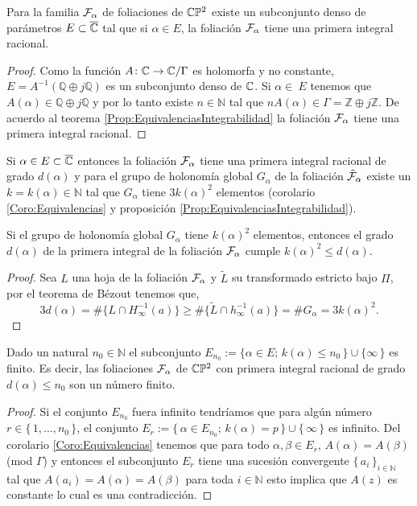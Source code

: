 \begin{Teorema}
\label{Teo:DensidadPrimerasIntegrales}
Para la familia $\mathcal{F}_{\alpha}$ de foliaciones de $\mathbb{C}\mathbb{P}^2$ existe un subconjunto denso de parámetros $E\subset\overline{\mathbb{C}}$ tal que si $\alpha\in E$, la foliación $\mathcal{F}_{\alpha}$ tiene una primera integral racional.
\end{Teorema}
\begin{proof}
Como la función $A\colon\mathbb{C}\rightarrow\mathbb{C}/\Gamma$ es holomorfa y no constante, $E=A^{-1}(\mathbb{Q}\oplus j\mathbb{Q})$ es un subconjunto denso de $\mathbb{C}$. Si $\alpha\in\ E$ tenemos que $A(\alpha)\in\mathbb{Q}\oplus j\mathbb{Q}$ y por lo tanto existe $n\in\mathbb{N}$ tal que $nA(\alpha)\in\Gamma=\mathbb{Z}\oplus j\mathbb{Z}$. De acuerdo al teorema \ref{Prop:EquivalenciasIntegrabilidad} la foliación $\mathcal{F}_{\alpha}$ tiene una primera integral racional.
\end{proof}

Si $\alpha\in E\subset\overline{\mathbb{C}}$ entonces la foliación $\mathcal{F}_{\alpha}$ tiene una primera integral racional de grado $d(\alpha)$ y para el grupo de holonomía global $G_{\alpha}$ de la foliación $\tilde{\mathcal{F}}_{\alpha}$ existe un $k=k(\alpha)\in\mathbb{N}$ tal que  $G_{\alpha}$ tiene $3k(\alpha)^{2}$ elementos (corolario \ref{Coro:Equivalencias} y proposición \ref{Prop:EquivalenciasIntegrabilidad}).

\begin{Lema}
\label{Lema:Cota}
Si el grupo de holonomía global $G_{\alpha}$ tiene $k(\alpha)^{2}$ elementos, entonces el grado $d(\alpha)$ de la primera integral de la foliación $\mathcal{F}_{\alpha}$ cumple $k(\alpha)^{2}\leq d(\alpha)$.
\end{Lema} 
\begin{proof}
Sea $L$ una hoja de la foliación $\mathcal{F}_{\alpha}$ y $\tilde{L}$ su transformado estricto bajo $\Pi$, por el teorema de Bézout tenemos que,
$$3d(\alpha)=\#\{L\cap H_{\infty}^{-1}(a)\}\geq\#\{\tilde{L}\cap h_{\infty}^{-1}(a)\}=\#G_{\alpha}=3k(\alpha)^{2}.$$
\end{proof}

\begin{Teorema}
\label{Teo:GradosGrandes}
Dado un natural $n_{0}\in\mathbb{N}$ el subconjunto $E_{n_{0}}:=\{\alpha\in E;\, k(\alpha)\leq n_{0}\, \}\cup\{\infty \, \}$ es finito. Es decir, las foliaciones $\mathcal{F}_{\alpha}$ de $\mathbb{C}\mathbb{P}^2$ con primera integral racional de grado $d(\alpha)\leq n_{0}$ son un número finito. 
\end{Teorema}
\begin{proof}
Si el conjunto $E_{n_{0}}$ fuera infinito tendríamos que para algún número $r\in\{\, 1,\ldots,n_{0} \, \}$, el conjunto $E_{r}:=\{\, \alpha\in E_{n_{0}};\, k(\alpha)=p \, \}\cup\{\, \infty\, \}$ es infinito. Del corolario \ref{Coro:Equivalencias} tenemos que para todo $\alpha,\beta\in E_{r}$, $A(\alpha)=A(\beta)$ (mod $\Gamma$) y entonces el subconjunto $E_{r}$ tiene una sucesión convergente $\{\, a_{i} \, \}_{i\in\mathbb{N}}$ tal que $A(a_{i})=A(\alpha)=A(\beta)$ para toda $i\in\mathbb{N}$ esto implica que $A(z)$ es constante lo cual es una contradicción.
\end{proof}

